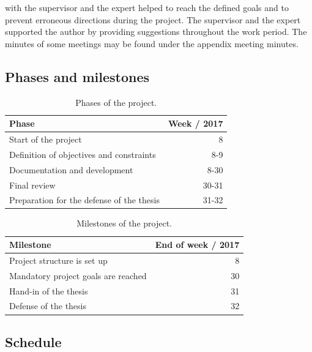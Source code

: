 \documentclass[%
    a4paper,    %
    justified,  %
    nobib,      %
    openany     %
]{tufte-book}
\begin{document}
 with the supervisor and the expert helped to reach
the defined goals and to prevent erroneous directions during the project. The
supervisor and the expert supported the author by providing suggestions
throughout the work period. The minutes of some meetings may be
found under the appendix meeting minutes.~

\subsection{Phases and milestones}
\label{subsec:project-phases-milestones}

\begin{table}[h]
  \caption{Phases of the project.}
  \begin{tabularx}{\textwidth}{Xr}
    \toprule
    \textbf{Phase}   & \textbf{Week / 2017} \\
    \midrule
    Start of the project & 8 \\
    Definition of objectives and constraints & 8-9 \\
    Documentation and development & 8-30 \\
    Final review & 30-31 \\
    Preparation for the defense of the thesis & 31-32 \\
    \bottomrule
  \end{tabularx}
\end{table}

\begin{table}[h]
  \caption{Milestones of the project.}
  \begin{tabularx}{\textwidth}{Xr}
    \toprule
    \textbf{Milestone}   & \textbf{End of week / 2017} \\
    \midrule
    Project structure is set up & 8 \\
    Mandatory project goals are reached & 30 \\
    Hand-in of the thesis & 31 \\
    Defense of the thesis & 32 \\
    \bottomrule
  \end{tabularx}
\end{table}

\newpage{}

\subsection{Schedule}
\label{subsec:project-schedule}
\end{document}
